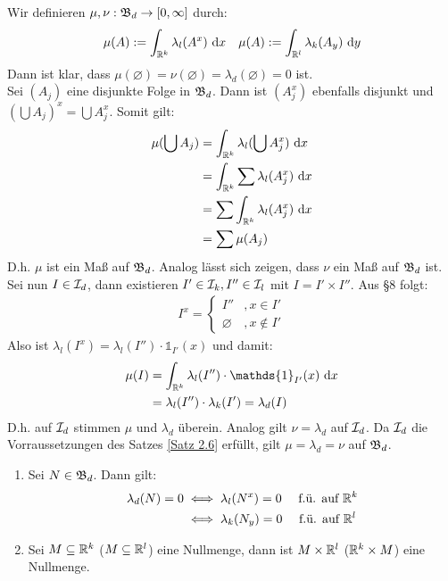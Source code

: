 \documentclass[a4paper,twoside,DIV15,BCOR12mm,chapterprefix=true,headings=onelinechapter]{scrbook}
\begin{document}
\begin{beweis}
Wir definieren $\mu,\nu:\mathfrak{B}_d\to[0,\infty]$ durch:
\begin{align*}
\mu(A):=\int_{\mathbb{R}^k} \lambda_l(A^x)\text{ d}x && \mu(A):=\int_{\mathbb{R}^l} \lambda_k(A_y)\text{ d}y
\end{align*}
Dann ist klar, dass $\mu(\varnothing)=\nu(\varnothing)=\lambda_d(\varnothing)=0$ ist.\\
Sei $(A_j)$ eine disjunkte Folge in $\mathfrak{B}_d$. Dann ist $(A_j^x)$ ebenfalls disjunkt und $(\bigcup A_j)^x=\bigcup A_j^x$. Somit gilt:
\begin{align*}
\mu(\bigcup A_j)&=\int_{\mathbb{R}^k} \lambda_l(\bigcup A_j^x)\text{ d}x\\
&=\int_{\mathbb{R}^k} \sum \lambda_l(A_j^x)\text{ d}x\\
&=\sum \int_{\mathbb{R}^k} \lambda_l(A_j^x)\text{ d}x\\
&=\sum \mu(A_j)
\end{align*}
D.h. $\mu$ ist ein Maß auf $\mathfrak{B}_d$. Analog lässt sich zeigen, dass $\nu$ ein Maß auf $\mathfrak{B}_d$ ist.\\
Sei nun $I\in\mathcal{I}_d$, dann existieren $I'\in\mathcal{I}_k, I''\in\mathcal{I}_l$ mit $I=I'\times I''$. Aus §8 folgt:
\begin{align*}
I^x=\begin{cases} I''&,x\in I'\\ 
\varnothing &,x\not\in I'\end{cases}
\end{align*}
Also ist $\lambda_l(I^x)=\lambda_l(I'')\cdot\mathds{1}_{I'}(x)$ und damit:
\begin{align*}
\mu(I)&=\int_{\mdr^k}\lambda_l(I'')\cdot\mathds{1}_{I'}(x) \text{ d}x\\
&=\lambda_l(I'')\cdot\lambda_k(I') = \lambda_d(I)
\end{align*}
D.h. auf $\mathcal{I}_d$ stimmen $\mu$ und $\lambda_d$ überein. Analog gilt $\nu=\lambda_d$ auf $\mathcal{I}_d$. Da $\mathcal{I}_d$ die Vorraussetzungen des Satzes \ref{Satz 2.6} erfüllt, gilt $\mu=\lambda_d=\nu$ auf $\mathfrak{B}_d$.
\end{beweis}

\begin{folgerung}
\label{Folgerung 9.2}
\begin{enumerate}
\item Sei $N\in\mathfrak{B}_d$. Dann gilt:
\begin{align*}
\lambda_d(N)=0 &\iff \lambda_l(N^x) = 0 \quad \text{ f.ü. auf }\mathbb{R}^k\\
&\iff \lambda_k(N_y) = 0 \quad \text{ f.ü. auf }\mathbb{R}^l\\
\end{align*}
\item Sei $M\subseteq\mathbb{R}^k$ ($M\subseteq\mathbb{R}^l$) eine Nullmenge, dann ist $M\times\mathbb{R}^l$ ($\mathbb{R}^k\times M$) eine Nullmenge.
\end{enumerate}
\end{folgerung}
\end{document}
